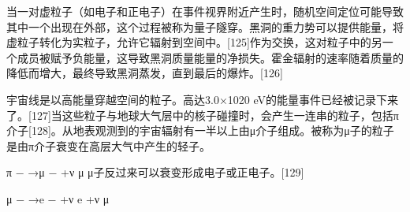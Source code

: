 当一对虚粒子（如电子和正电子）在事件视界附近产生时，随机空间定位可能导致其中一个出现在外部，这个过程被称为量子隧穿。黑洞的重力势可以提供能量，将虚粒子转化为实粒子，允许它辐射到空间中。[125]作为交换，这对粒子中的另一个成员被赋予负能量，这导致黑洞质量能量的净损失。霍金辐射的速率随着质量的降低而增大，最终导致黑洞蒸发，直到最后的爆炸。[126]

宇宙线是以高能量穿越空间的粒子。高达3.0×1020 eV的能量事件已经被记录下来了。[127]当这些粒子与地球大气层中的核子碰撞时，会产生一连串的粒子，包括π介子[128]。从地表观测到的宇宙辐射有一半以上由μ介子组成。被称为μ子的粒子是由π介子衰变在高层大气中产生的轻子。

π − →μ − +ν μ
μ子反过来可以衰变形成电子或正电子。[129]

μ − →e − +ν e +ν μ